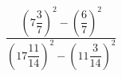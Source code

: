 \begin{ex}[type=calculate]
	\begin{condition}
		\( \dfrac{\left( 7\dfrac{3}{7} \right)^2-\left( \dfrac{6}{7} \right)^2}{\left( 17\dfrac{11}{14} \right)^2-\left( 11\dfrac{3}{14} \right)^2} \)
	\end{condition}
\end{ex}